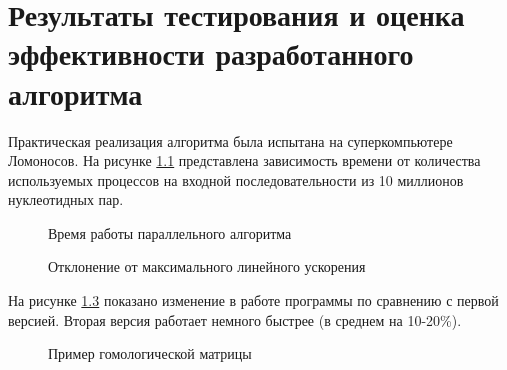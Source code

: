 \chapter{Результаты тестирования и оценка эффективности разработанного алгоритма} \label{chapt4}

Практическая реализация алгоритма была испытана на суперкомпьютере Ломоносов.
На рисунке \ref{img:a1} представлена зависимость времени от количества
используемых процессов на входной последовательности из 10 миллионов нуклеотидных
пар.


\begin{figure}[h]
\caption{Время работы параллельного алгоритма}
\label{img:a1}  
\end{figure}

\begin{figure}[h]
\caption{Отклонение от максимального линейного ускорения}
\label{img:a2}  
\end{figure}

\clearpage


На рисунке \ref{img:a4} показано изменение в работе программы по сравнению
с первой версией. Вторая версия работает немного быстрее (в среднем на 10-20\%).
\begin{figure}[h]
\caption{Пример гомологической матрицы}
\label{img:a4}  
\end{figure}

